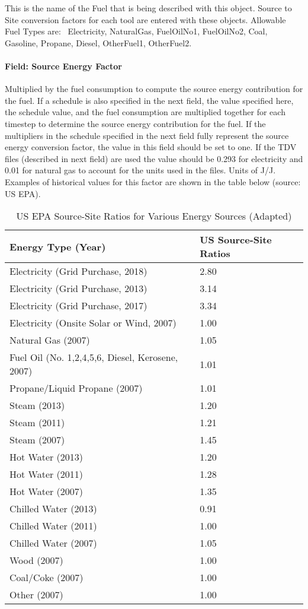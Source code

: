 This is the name of the Fuel that is being described with this object. Source to Site conversion factors for each tool are entered with these objects. Allowable Fuel Types are:~ Electricity, NaturalGas, FuelOilNo1, FuelOilNo2, Coal, Gasoline, Propane, Diesel, OtherFuel1, OtherFuel2.

\paragraph{Field: Source Energy Factor}\label{field-source-energy-factor}

Multiplied by the fuel consumption to compute the source energy contribution for the fuel. If a schedule is also specified in the next field, the value specified here, the schedule value, and the fuel consumption are multiplied together for each timestep to determine the source energy contribution for the fuel. If the multipliers in the schedule specified in the next field fully represent the source energy conversion factor, the value in this field should be set to one. If the TDV files (described in next field) are used the value should be 0.293 for electricity and 0.01 for natural gas to account for the units used in the files. Units of J/J.  Examples of historical values for this factor are shown in the table below (source: US EPA).

{\scriptsize
\begin{longtable}[c]{p{4in}p{1.5in}}
\caption{US EPA Source-Site Ratios for Various Energy Sources (Adapted)\label{table:us_epa_source_site_ratios_for_various_energy_sources}} \tabularnewline
\toprule
Energy Type (Year) & US Source-Site Ratios \tabularnewline
\midrule
\endfirsthead

Electricity (Grid Purchase, 2018) & 2.80 \tabularnewline
Electricity (Grid Purchase, 2013) & 3.14 \tabularnewline
Electricity (Grid Purchase, 2017) & 3.34 \tabularnewline
Electricity (Onsite Solar or Wind, 2007) & 1.00 \tabularnewline
\midrule
Natural Gas (2007) & 1.05 \tabularnewline
Fuel Oil (No. 1,2,4,5,6, Diesel, Kerosene, 2007) & 1.01 \tabularnewline
Propane/Liquid Propane (2007) & 1.01 \tabularnewline
\midrule
Steam (2013) & 1.20 \tabularnewline
Steam (2011) & 1.21 \tabularnewline
Steam (2007) & 1.45 \tabularnewline
\midrule
Hot Water (2013) & 1.20 \tabularnewline
Hot Water (2011) & 1.28 \tabularnewline
Hot Water (2007) & 1.35 \tabularnewline
\midrule
Chilled Water (2013) & 0.91 \tabularnewline
Chilled Water (2011) & 1.00 \tabularnewline
Chilled Water (2007) & 1.05 \tabularnewline
\midrule
Wood (2007) & 1.00 \tabularnewline
Coal/Coke (2007) & 1.00 \tabularnewline
Other (2007) & 1.00 \tabularnewline

\bottomrule
\end{longtable}
}


